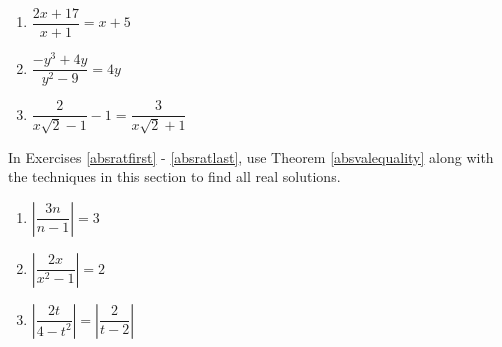 \documentclass[10pt]{article}
\begin{document}
\begin{multicols}{3}
\begin{enumerate}
\setcounter{enumi}{\value{HW}}


\item $\dfrac{2x + 17}{x + 1} = x + 5$

\item $\dfrac{-y^{3} + 4y}{y^{2} - 9} = 4y$  

\item $\dfrac{2}{x\sqrt{2} - 1}  - 1 = \dfrac{3}{x \sqrt{2} + 1}$\label{rateqnlast}

\setcounter{HW}{\value{enumi}}
\end{enumerate}
\end{multicols}



In Exercises \ref{absratfirst} - \ref{absratlast}, use Theorem \ref{absvalequality} along with the techniques in this section to find all real solutions.

\begin{multicols}{3}
\begin{enumerate}
\setcounter{enumi}{\value{HW}}

\item $\left|\dfrac{3n}{n-1}  \right| = 3$ \label{absratfirst}
\item $\left| \dfrac{2x}{x^2-1}\right| = 2$
\item $\left| \dfrac{2t}{4-t^2}\right| = \left|\dfrac{2}{t-2}\right|$ \label{absratlast}

\setcounter{HW}{\value{enumi}}
\end{enumerate}
\end{multicols}





\closegraphsfile
\end{document}
